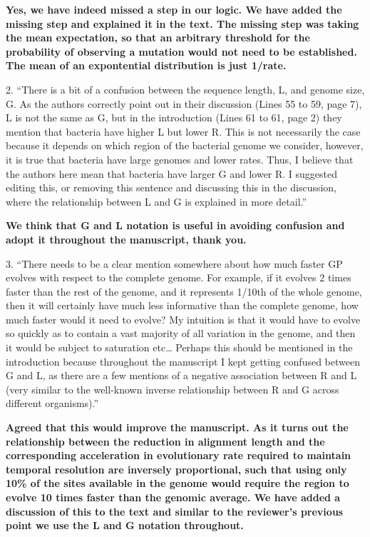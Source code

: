 \documentclass[11pt,oneside,letterpaper]{article}
\begin{document}
\textbf{Yes, we have indeed missed a step in our logic. We have added the missing step and explained it in the text. The missing step was taking the mean expectation, so that an arbitrary threshold for the probability of observing a mutation would not need to be established. The mean of an expontential distribution is just 1/rate.}

2. ``There is a bit of a confusion between the sequence length, L, and genome size, G. As the authors correctly point out in their discussion (Lines 55 to 59, page 7), L is not the same as G, but in the introduction (Lines 61 to 61, page 2) they mention that bacteria have higher L but lower R. This is not necessarily the case because it depends on which region of the bacterial genome we consider, however, it is true that bacteria have large genomes and lower rates. Thus, I believe that the authors here mean that bacteria have larger G and lower R. I suggested editing this, or removing this sentence and discussing this in the discussion, where the relationship between L and G is explained in more detail.''

\textbf{We think that G and L notation is useful in avoiding confusion and adopt it throughout the manuscript, thank you.}

3. ``There needs to be a clear mention somewhere about how much faster GP evolves with respect to the complete genome. For example, if it evolves 2 times faster than the rest of the genome, and it represents 1/10th of the whole genome, then it will certainly have much less informative than the complete genome, how much faster would it need to evolve? My intuition is that it would have to evolve so quickly as to contain a vast majority of all variation in the genome, and then it would be subject to saturation etc… Perhaps this should be mentioned in the introduction because throughout the manuscript I kept getting confused between G and L, as there are a few mentions of a negative association between R and L (very similar to the well-known inverse relationship between R and G across different organisms).''

\textbf{Agreed that this would improve the manuscript. As it turns out the relationship between the reduction in alignment length and the corresponding acceleration in evolutionary rate required to maintain temporal resolution are inversely proportional, such that using only 10\% of the sites available in the genome would require the region to evolve 10 times faster than the genomic average. We have added a discussion of this to the text and similar to the reviewer's previous point we use the L and G notation throughout.}
\end{document}

